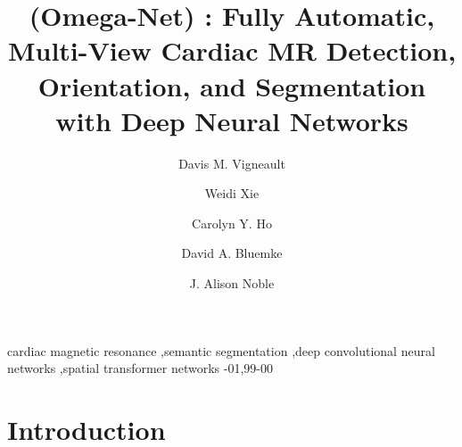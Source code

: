 \documentclass[final,5p]{elsarticle}
\newcommand\hl[1]{%
  \bgroup
  \hskip0pt\color{black!80!black}%
  #1%
  \egroup
}
\let\linenumbers\nolinenumbers\nolinenumbers
\begin{document}




\begin{frontmatter}

\title{\omeganet{} \hl{(Omega-Net)}: Fully Automatic, Multi-View Cardiac MR Detection, Orientation, and Segmentation with Deep Neural Networks}

\author[oxford,nih,tufts]{Davis M. Vigneault}

\author[oxford]{Weidi Xie}
\author[brigham]{Carolyn Y. Ho}
\author[wisc]{David A. Bluemke}
\author[oxford]{J. Alison Noble}

\address[oxford]{Institute of Biomedical Engineering, Department of Engineering, University of Oxford}
\address[nih]{Department of Radiology and Imaging Sciences, Clinical Center, National Institutes of Health}
\address[tufts]{Tufts University School of Medicine, Sackler School of Graduate Biomedical Sciences}
\address[brigham]{Cardiovascular Division, Brigham and Women's Hospital}
\address[wisc]{University of Wisconsin-Madison, School of Medicine and Public Health}


\begin{abstract}



\end{abstract}

\begin{keyword}
cardiac magnetic resonance \sep semantic segmentation \sep deep convolutional neural networks \sep spatial transformer networks
-01\sep  99-00
\end{keyword}

\end{frontmatter}

\linenumbers

\newcommand{\figdir}{./figures/}
\newcommand{\tabdir}{./tables/}


\section{Introduction} \label{introduction}
\end{document}
